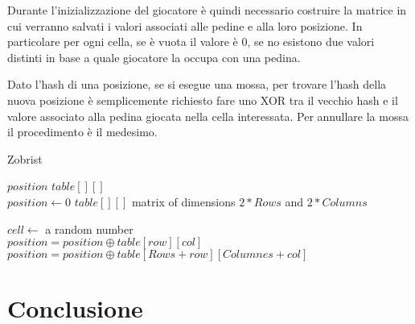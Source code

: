 \documentclass[a4paper]{article}
\begin{document}
Durante l'inizializzazione del giocatore è quindi necessario costruire la 
matrice in cui verranno salvati i valori associati alle pedine e alla loro 
posizione. In particolare per ogni cella, se è vuota il valore è 0, se no 
esistono due valori distinti in base a quale giocatore la occupa con una pedina.

Dato l'hash di una posizione, se si esegue una mossa, per trovare l'hash della
nuova posizione è semplicemente richiesto fare uno XOR tra il vecchio hash e il
valore associato alla pedina giocata nella cella interessata. Per annullare la
mossa il procedimento è il medesimo.

\begin{algorithm}
  \caption{Zobrist}
  \begin{algorithmic}
    \State $position$
    \State $table[][]$
    \\
      \State $position \gets 0$
      \State $table[][]$ matrix of dimensions $2 * Rows$ and $2 * Columns$

      \State $cell \gets $ a random number
      \EndFor
    \EndFunction
    \\
        \State $position = position \oplus table[row][col]$
      \Else
        \State $position = position \oplus table[Rows + row][Columnes + col]$
      \EndIf
    \EndFunction
  \end{algorithmic}
\end{algorithm}

\section{Conclusione}
\end{document}
